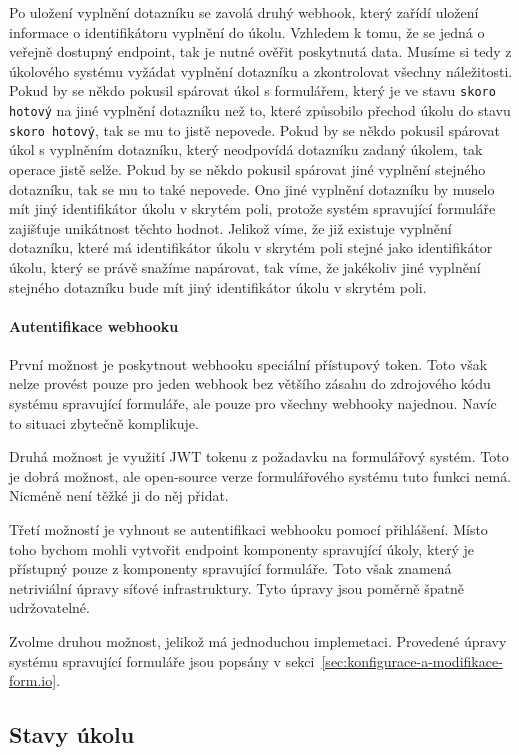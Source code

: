 Po uložení vyplnění dotazníku se zavolá druhý webhook, který zařídí uložení informace o identifikátoru vyplnění do úkolu.
Vzhledem k tomu, že se jedná o veřejně dostupný endpoint, tak je nutné ověřit poskytnutá data.
Musíme si tedy z úkolového systému vyžádat vyplnění dotazníku a zkontrolovat všechny náležitosti.
Pokud by se někdo pokusil spárovat úkol s formulářem, který je ve stavu \texttt{skoro hotový} na jiné vyplnění dotazníku než to, které způsobilo přechod úkolu do stavu \texttt{skoro hotový}, tak se mu to jistě nepovede.
Pokud by se někdo pokusil spárovat úkol s vyplněním dotazníku, který neodpovídá dotazníku zadaný úkolem, tak operace jistě selže.
Pokud by se někdo pokusil spárovat jiné vyplnění stejného dotazníku, tak se mu to také nepovede.
Ono jiné vyplnění dotazníku by muselo mít jiný identifikátor úkolu v skrytém poli, protože systém spravující formuláře zajišťuje unikátnost těchto hodnot.
Jelikož víme, že již existuje vyplnění dotazníku, které má identifikátor úkolu v skrytém poli stejné jako identifikátor úkolu, který se právě snažíme napárovat, tak víme, že jakékoliv jiné vyplnění stejného dotazníku bude mít jiný identifikátor úkolu v skrytém poli.

\paragraph{Autentifikace webhooku}

První možnost je poskytnout webhooku speciální přístupový token.
Toto však nelze provést pouze pro jeden webhook bez většího zásahu do zdrojového kódu systému spravující formuláře, ale pouze pro všechny webhooky najednou.
Navíc to situaci zbytečně komplikuje.

Druhá možnost je využití JWT tokenu z požadavku na formulářový systém.
Toto je dobrá možnost, ale open-source verze formulářového systému tuto funkci nemá.
Nicméně není těžké ji do něj přidat.

Třetí možností je vyhnout se autentifikaci webhooku pomocí přihlášení.
Místo toho bychom mohli vytvořit endpoint komponenty spravující úkoly, který je přístupný pouze z komponenty spravující formuláře.
Toto však znamená netriviální úpravy síťové infrastruktury.
Tyto úpravy jsou poměrně špatně udržovatelné.

Zvolme druhou možnost, jelikož má jednoduchou implemetaci.
Provedené úpravy systému spravující formuláře jsou popsány v sekci~\ref{sec:konfigurace-a-modifikace-form.io}.

\subsection{Stavy úkolu}\label{subsec:stavy-ukolu}

